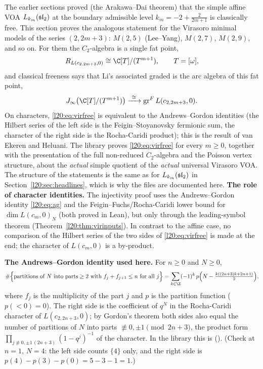 The earlier sections proved (the Arakawa--Dai theorem) that the simple affine VOA $L_{k_m}(\mathfrak{sl}_2)$ at the boundary
admissible level $k_m = -2+\frac{2}{2m+1}$ is classically free. This section proves the analogous statement for the Virasoro
minimal models of the series $(2,2m+3)$: $M(2,5)$ (Lee--Yang), $M(2,7)$, $M(2,9)$, and so on. For them the $C_2$-algebra
is a single fat point,
\begin{equation*}
R_{L(c_{2,2m+3},0)}\cong\C[T]/(T^{m+1}),\qquad T=[\omega],
\end{equation*}
and classical freeness says that Li's associated graded is the arc algebra of this fat point,
\begin{equation}\label{l20:eq:virfree}
\ltwentyJ\bigl(\C[T]/(T^{m+1})\bigr)\xrightarrow{\ \cong\ }\ltwentygr L(c_{2,2m+3},0).
\end{equation}
On characters, \eqref{l20:eq:virfree} is equivalent to the Andrews--Gordon identities (the Hilbert series of the
left side is the Feigin--Stoyanovsky fermionic sum, the character of the right side is the Rocha-Caridi product);
this is the result of van Ekeren and Heluani. The library proves \eqref{l20:eq:virfree} for every $m\ge0$, together with
the presentation of the full non-reduced $C_2$-algebra and the Poisson vertex structure, about the
\emph{actual} simple quotient of the \emph{actual} universal Virasoro VOA. The structure of the statements is the
same as for $L_{k_m}(\mathfrak{sl}_2)$ in Section~\ref{l20:sec:headlines}, which is why the files are documented here.
\textbf{The role of character identities.} The injectivity proof uses the Andrews--Gordon identity \eqref{l20:eq:ag} and
the Feigin--Fuchs/Rocha-Caridi lower bound for $\dim L(c_m,0)_N$ (both proved in Lean), but only through the leading-symbol
theorem  (Theorem~\ref{l20:thm:virinputs}). In contrast to the affine case, no comparison of the
Hilbert series of the two sides of \eqref{l20:eq:virfree} is made at the end; the character of $L(c_m,0)$ is a by-product.

\textbf{The Andrews--Gordon identity used here.} For $n\ge0$ and $N\ge0$,
\begin{equation}\label{l20:eq:ag}
\#\Bigl\{\text{partitions of }N\text{ into parts}\ge2\text{ with }f_j+f_{j+1}\le n\text{ for all }j\Bigr\}
=\sum_{k\in\Z}(-1)^k\,p\Bigl(N-\tfrac{k((2n+3)k+2n+1)}{2}\Bigr),
\end{equation}
where $f_j$ is the multiplicity of the part $j$ and $p$ is the partition function ($p(<0)=0$). The right side is the
coefficient of $q^N$ in the Rocha-Caridi character of $L(c_{2,2n+3},0)$; by Gordon's theorem both sides also equal the number
of partitions of $N$ into parts $\not\equiv0,\pm1\pmod{2n+3}$, the product form
$\prod_{j\not\equiv0,\pm1\,(2n+3)}(1-q^j)^{-1}$ of the character. In the library this is
 ().
(Check at $n=1$, $N=4$: the left side counts $\{4\}$ only, and the right side is $p(4)-p(3)-p(0)=5-3-1=1$.)

